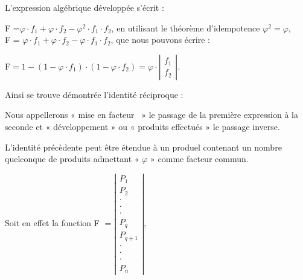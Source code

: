 L'expression algébrique développée s'écrit :



F =$\varphi\cdot f_{1}+\varphi\cdot f_{2}-\varphi^{2}\cdot f_{1}\cdot f_{2}$,
en utilisant le théorème d'idempotence $\varphi^{2}=\varphi$, \\
F = $\varphi\cdot f_{1}+\varphi\cdot f_{2}-\varphi\cdot f_{1}\cdot f_{2}$,
que nous pouvons écrire :



F$=1-\left(1-\varphi\cdot f_{1}\right)\cdot\left(1-\varphi\cdot f_{2}\right)=\varphi\cdot\left|\begin{array}{c}
f_{1}\\
f_{2}
\end{array}\right|$.



Ainsi se trouve démontrée l'identité réciproque :



\begin{center}
\end{center}



Nous appellerons «  mise en facteur~  »{} le passage de la première
expression à la seconde et «  développement  »{} ou «  produits
effectués  »{} le passage inverse.

L'identité précèdente peut être étendue à un produel contenant un
nombre quelconque de produits admettant «   $\varphi$  »{} comme
facteur commun.



Soit en effet la fonction F $=\left|\begin{array}{l}
P_{1}\\
P_{2}\\
\cdot\\
\cdot\\
\cdot\\
P_{q}\\
P_{q+1}\\
\cdot\\
\cdot\\
\cdot\\
P_{n}
\end{array}\right|$,



